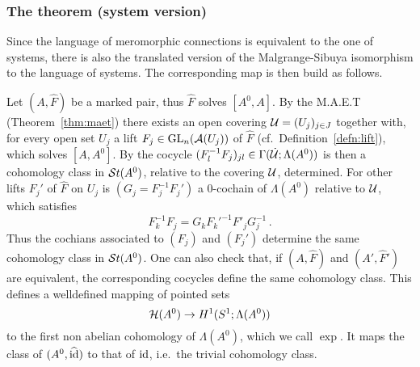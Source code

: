 \subsubsection{The theorem (system version)}
Since the language of meromorphic connections is equivalent to the one of
systems, there is also the translated version of the Malgrange-Sibuya
isomorphism to the language of systems. The corresponding map is then build as
follows.

Let $(A,\hat F)$ be a marked pair, thus $\hat F$ solves $[A^0,A]$.
By the M.A.E.T (Theorem~\ref{thm:maet}) there exists an open covering
$\mathcal{U}=(U_j)_{j\in J}$ together with, for every open set $U_j$ a lift
$F_j\in\operatorname{GL}_n(\mathcal{A}(U_j))$ of $\hat F$ (cf.\ Definition~\ref{defn:lift}), which
solves $[A,A^0]$.
By the cocycle $(F_l^{-1}F_j)_{jl}\in\Gamma(\dot{\mathcal{U}};\Lambda(A^0))$ is then a
cohomology class in $\mathcal{S}{}t(A^0)$, relative to the covering $\mathcal{U}$, determined.
For other lifts $F_j'$ of $\hat F$ on $U_j$ is $(G_j=F_j^{-1}F_j')$ a
$0$-cochain of $\Lambda(A^0)$ relative to $\mathcal{U}$, which satisfies
\[
  F_k^{-1}F_j=G_k F_k'^{-1}F'_j G_j^{-1} \,.
\]
Thus the cochians associated to $(F_j)$ and $(F_j')$ determine the same
cohomology class in $\mathcal{S}{}t(A^0)$.
One can also check that, if $(A,\hat F)$ and $(A',\hat F')$ are equivalent, the
corresponding cocycles define the same cohomology class.
This defines a welldefined mapping of pointed sets
\[
  \mathcal{H}(A^0)\to H^1(S^1;\Lambda(A^0))
\]
to the first non abelian cohomology of $\Lambda(A^0)$, which we call $\exp$.
It maps the class of $(A^0,\widehat{\operatorname{id}})$ to that of $\operatorname{id}$, i.e.\ the trivial
cohomology class.

